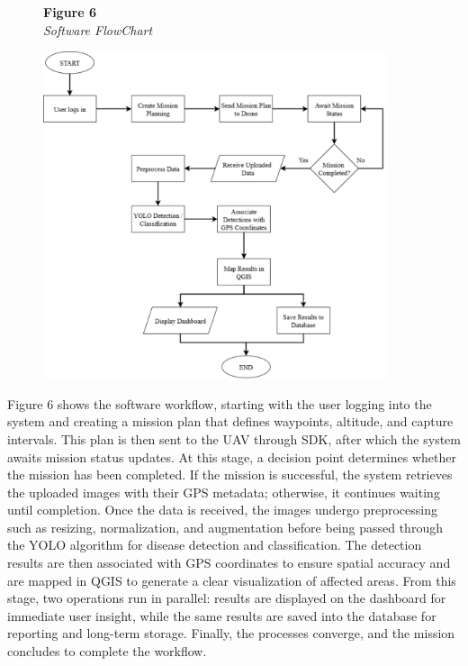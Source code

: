 	\begin{figure}[H]
		\raggedright
		\textbf{Figure 6} \\ %
		\textit{Software FlowChart} %
		
		\vspace{0.5em}
		\centering
		\includegraphics[width=0.9\textwidth]{figures/SoftFlow.pdf} %
		
		\vspace{0.5em}
		\raggedright
		
		\label{fig:SoftFlow}
	\end{figure}
	
	Figure 6 shows the software workflow, starting with the user logging into the system and creating a mission plan that defines waypoints, altitude, and capture intervals. This plan is then sent to the UAV through SDK, after which the system awaits mission status updates. At this stage, a decision point determines whether the mission has been completed. If the mission is successful, the system retrieves the uploaded images with their GPS metadata; otherwise, it continues waiting until completion. Once the data is received, the images undergo preprocessing such as resizing, normalization, and augmentation before being passed through the YOLO algorithm for disease detection and classification. The detection results are then associated with GPS coordinates to ensure spatial accuracy and are mapped in QGIS to generate a clear visualization of affected areas. From this stage, two operations run in parallel: results are displayed on the dashboard for immediate user insight, while the same results are saved into the database for reporting and long-term storage. Finally, the processes converge, and the mission concludes to complete the workflow.
	
